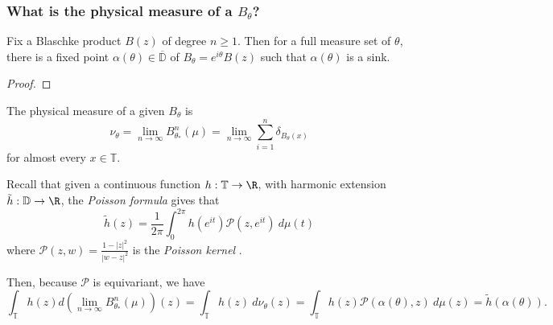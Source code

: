 \documentclass[10pt]{amsart}
\numberwithin{equation}{section}     %
\newcommand{\T}{\mathbb{T}}
\newcommand{\cP}{\mathcal{P}}\newcommand{\cQ}{\mathcal{Q}}\newcommand{\cR}{\mathcal{R}}
\newcommand{\D}{\mathbb{D}}
\begin{document}
\subsubsection{What is the physical measure of a $B_\theta$?}  


\begin{lemma}
      Fix a Blaschke product $B(z)$ of degree $n \geq 1$. Then for a full measure set of $\theta$, there is a fixed point $\alpha(\theta) \in \overline{\D}$ of $B_\theta = e^{i\theta}B(z)$ such that $\alpha(\theta)$ is a sink. 
\end{lemma}

\begin{proof}
    
\end{proof}


The physical measure  of a given $B_\theta$ is $$\nu_\theta = \lim \limits_{n \to \infty} B_{\theta_*}^n(\mu) = \lim \limits_{n \to \infty} \sum \limits_{i=1}^n \delta_{B_\theta(x)}$$ for almost every $x \in \T$.


Recall that given a continuous function $h:\T \to \R$, with harmonic extension $\tilde{h}:\D \to \R$, the \emph{Poisson formula} gives that $$\tilde{h}(z) = \frac{1}{2\pi}\int_{0}^{2\pi} h(e^{it}) \cP(z,e^{it}) \ d\mu(t)$$ where $\cP(z,w) = \frac{1 - |z|^2}{|w-z|^2}$ is the \emph{Poisson kernel} \cite{lyons2017probability}. 

Then, because $\cP$ is equivariant, we have $$\int_\T h(z) d \left(\lim \limits_{n \to \infty} B^n_{\theta_*}(\mu)\right)(z) = \int_\T h(z) \ d\nu_\theta(z) = \int_\T h(z) \cP(\alpha(\theta), z) \ d\mu(z) = \tilde{h}(\alpha(\theta)).$$


\end{document}
